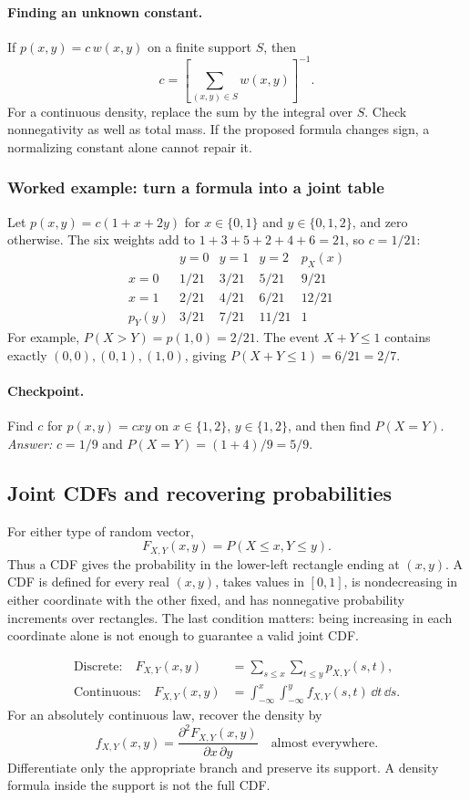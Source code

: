 \paragraph{Finding an unknown constant.} If $p(x,y)=c\,w(x,y)$ on a finite support $S$, then
\[
 c=\left[\sum_{(x,y)\in S}w(x,y)\right]^{-1}.
\]
For a continuous density, replace the sum by the integral over $S$. Check nonnegativity as well as total mass. If the proposed formula changes sign, a normalizing constant alone cannot repair it.

\subsubsection*{Worked example: turn a formula into a joint table}
Let $p(x,y)=c(1+x+2y)$ for $x\in\{0,1\}$ and $y\in\{0,1,2\}$, and zero otherwise. The six weights add to $1+3+5+2+4+6=21$, so $c=1/21$:
\[
\begin{array}{c|ccc|c}
 &y=0&y=1&y=2&p_X(x)\\\hline
x=0&1/21&3/21&5/21&9/21\\
x=1&2/21&4/21&6/21&12/21\\\hline
p_Y(y)&3/21&7/21&11/21&1
\end{array}
\]
For example, $P(X>Y)=p(1,0)=2/21$. The event $X+Y\leq1$ contains exactly $(0,0),(0,1),(1,0)$, giving $P(X+Y\leq1)=6/21=2/7$.

\paragraph{Checkpoint.} Find $c$ for $p(x,y)=cxy$ on $x\in\{1,2\}$, $y\in\{1,2\}$, and then find $P(X=Y)$. \emph{Answer:} $c=1/9$ and $P(X=Y)=(1+4)/9=5/9$.

\subsection{Joint CDFs and recovering probabilities}

For either type of random vector,
\[
 F_{X,Y}(x,y)=P(X\leq x,Y\leq y).
\]
Thus a CDF gives the probability in the lower-left rectangle ending at $(x,y)$. A CDF is defined for every real $(x,y)$, takes values in $[0,1]$, is nondecreasing in either coordinate with the other fixed, and has nonnegative probability increments over rectangles. The last condition matters: being increasing in each coordinate alone is not enough to guarantee a valid joint CDF.

\[
\begin{aligned}
\text{Discrete:}\quad
F_{X,Y}(x,y)&=\sum_{s\leq x}\sum_{t\leq y}p_{X,Y}(s,t),\\
\text{Continuous:}\quad
F_{X,Y}(x,y)&=\int_{-\infty}^{x}\int_{-\infty}^{y}
f_{X,Y}(s,t)\,\dd t\,\dd s.
\end{aligned}
\]
For an absolutely continuous law, recover the density by
\[
 f_{X,Y}(x,y)=\frac{\partial^2 F_{X,Y}(x,y)}{\partial x\,\partial y}
 \quad\text{almost everywhere}.
\]
Differentiate only the appropriate branch and preserve its support. A density formula inside the support is not the full CDF.

